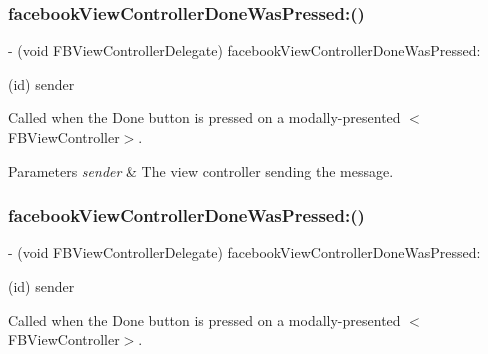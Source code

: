 \subsubsection{\texorpdfstring{facebook\+View\+Controller\+Done\+Was\+Pressed\+:()}{facebookViewControllerDoneWasPressed:()}\hspace{0.1cm}{\footnotesize\ttfamily [1/5]}}
{\footnotesize\ttfamily -\/ (void F\+B\+View\+Controller\+Delegate) facebook\+View\+Controller\+Done\+Was\+Pressed\+: \begin{DoxyParamCaption}\item[{(id)}]{sender }\end{DoxyParamCaption}\hspace{0.3cm}{\ttfamily [optional]}}

Called when the Done button is pressed on a modally-\/presented $<$\+F\+B\+View\+Controller$>$.


\begin{DoxyParams}{Parameters}
{\em sender} & The view controller sending the message. \\
\hline
\end{DoxyParams}
\mbox{\label{protocolFBViewControllerDelegate_01-p_aaba5fa381dc330b33a2931e1b1b7589c}} 
\subsubsection{\texorpdfstring{facebook\+View\+Controller\+Done\+Was\+Pressed\+:()}{facebookViewControllerDoneWasPressed:()}\hspace{0.1cm}{\footnotesize\ttfamily [2/5]}}
{\footnotesize\ttfamily -\/ (void F\+B\+View\+Controller\+Delegate) facebook\+View\+Controller\+Done\+Was\+Pressed\+: \begin{DoxyParamCaption}\item[{(id)}]{sender }\end{DoxyParamCaption}\hspace{0.3cm}{\ttfamily [optional]}}

Called when the Done button is pressed on a modally-\/presented $<$\+F\+B\+View\+Controller$>$.


